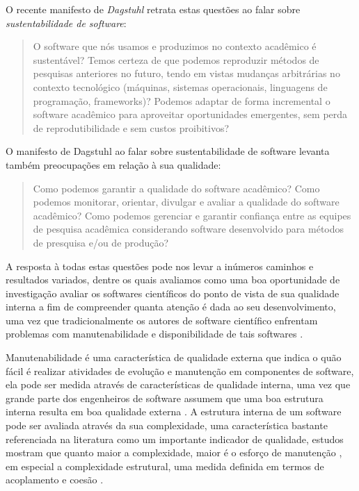 O recente manifesto de {\it
Dagstuhl} \cite{allen2017engineering} retrata estas questões ao falar sobre
{\it sustentabilidade de software}:

\begin{quote}
  O software que nós usamos e produzimos no contexto acadêmico é sustentável?
  Temos certeza de que podemos reproduzir métodos de pesquisas anteriores no
  futuro, tendo em vistas mudanças arbitrárias no contexto tecnológico
  (máquinas, sistemas operacionais, linguagens de programação, frameworks)?
  Podemos adaptar de forma incremental o software acadêmico para
  aproveitar oportunidades emergentes, sem perda de reprodutibilidade e
  sem custos proibitivos?
\end{quote}

O manifesto de Dagstuhl ao falar sobre sustentabilidade de software levanta também preocupações em relação à sua qualidade:

\begin{quote}
  Como podemos garantir a qualidade do software acadêmico? Como podemos
  monitorar, orientar, divulgar e avaliar a qualidade do software acadêmico?
  Como podemos gerenciar e garantir confiança entre as equipes de pesquisa
  acadêmica considerando software desenvolvido para métodos de presquisa e/ou
  de produção?
\end{quote}

A resposta à todas estas questões pode nos levar a inúmeros caminhos e
resultados variados, dentre os quais avaliamos como uma boa oportunidade de
investigação avaliar os softwares científicos do ponto de vista de sua
qualidade interna a fim de compreender quanta atenção é dada ao seu
desenvolvimento, uma vez que tradicionalmente os autores de software científico
enfrentam problemas com manutenabilidade e disponibilidade de tais softwares
\cite{Prlic2012}.

Manutenabilidade é uma característica de qualidade externa que indica o quão
fácil é realizar atividades de evolução e manutenção em componentes de
software, ela pode ser medida através de características de qualidade interna,
uma vez que grande parte dos engenheiros de software assumem que uma boa
estrutura interna resulta em boa qualidade externa \cite{Fenton2014}. A
estrutura interna de um software pode ser avaliada através da sua complexidade,
uma característica bastante referenciada na literatura como um importante
indicador de qualidade, estudos mostram que quanto maior a complexidade, maior
é o esforço de manutenção \cite{hashim1996software, Darcy2005}, em especial a
complexidade estrutural, uma medida definida em termos de acoplamento e coesão
\cite{Terceiro2012}.

